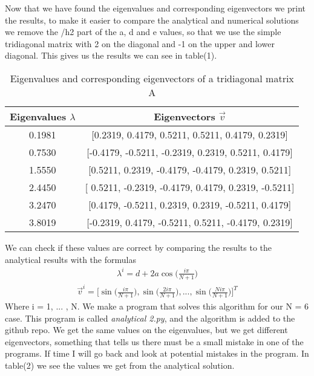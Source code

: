 \documentclass[english,notitlepage]{revtex4-1}  %
\begin{document}
Now that we have found the eigenvalues and corresponding eigenvectors we print the results, to make it easier to compare the analytical and numerical solutions we remove the /h2 part of the a, d and e values, so that we use the simple tridiagonal matrix with 2 on the diagonal and -1 on the upper and lower diagonal. This gives us the results we can see in table(1).
\begin{table}%
    \centering
    \caption{Eigenvalues and corresponding eigenvectors of a tridiagonal matrix A}
    \begin{tabular}{c@{\hspace{1cm}} c}
        \hline
        Eigenvalues $\lambda$ & Eigenvectors $\vec{v}$ \\
        \hline
        0.1981 & [0.2319, 0.4179, 0.5211, 0.5211, 0.4179, 0.2319] \\
        0.7530 &  [-0.4179, -0.5211, -0.2319, 0.2319, 0.5211, 0.4179] \\
        1.5550 & [0.5211, 0.2319, -0.4179, -0.4179, 0.2319, 0.5211]\\
        2.4450 &  [ 0.5211, -0.2319, -0.4179, 0.4179, 0.2319, -0.5211]\\
        3.2470 &  [0.4179, -0.5211, 0.2319, 0.2319, -0.5211, 0.4179]\\
        3.8019 & [-0.2319, 0.4179, -0.5211, 0.5211, -0.4179, 0.2319]\\
        \hline
    \end{tabular}\label{tab:output_table}
\end{table}
We can check if these values are correct by comparing the results to the analytical results with the formulas
\begin{align*}
\lambda^{i} = d + 2a \cos \bigg(\frac{i \pi}{N + 1} \bigg) 
\end{align*}
\begin{align*}
\vec{v}^{i} = \bigg[ \sin \bigg(\frac{i \pi}{N + 1} \bigg), \sin \bigg( \frac{2i \pi}{N + 1} \bigg), ... , \sin \bigg(\frac{Ni \pi}{N + 1} \bigg) \bigg]^T 
\end{align*}
Where i = 1, ... , N. 
We make a program that solves this algorithm for our N = 6 case. This program is called \textit{analytical 2.py}, and the algorithm is added to the github repo. We get the same values on the eigenvalues, but we get different eigenvectors, something that tells us there must be a small mistake in one of the programs. If time I will go back and look at potential mistakes in the program. In table(2) we see the values we get from the analytical solution.
\end{document}

